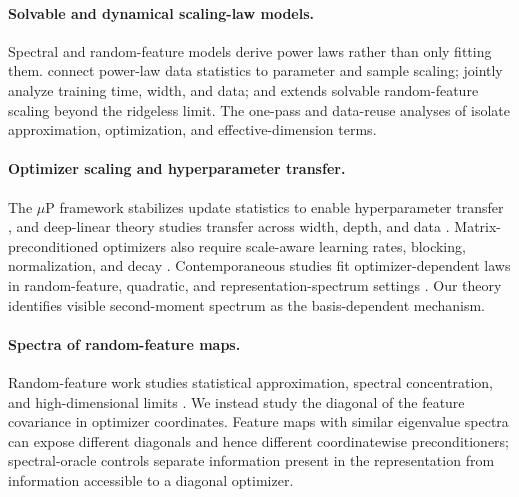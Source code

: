 \paragraph{Solvable and dynamical scaling-law models.}
Spectral and random-feature models derive power laws rather than only fitting them.  \citet{maloney2022solvable} connect power-law data statistics to parameter and sample scaling; \citet{bordelon2024dynamical} jointly analyze training time, width, and data; and \citet{zhang2024field} extends solvable random-feature scaling beyond the ridgeless limit.  The one-pass and data-reuse analyses of \citet{lin2024scaling,lin2025datareuse} isolate approximation, optimization, and effective-dimension terms.

\paragraph{Optimizer scaling and hyperparameter transfer.}
The $\mu$P framework stabilizes update statistics to enable hyperparameter transfer \cite{yang2021tensor}, and deep-linear theory studies transfer across width, depth, and data \cite{bordelon2025deep}.  Matrix-preconditioned optimizers also require scale-aware learning rates, blocking, normalization, and decay \cite{qiu2025hyperparameter}.  Contemporaneous studies fit optimizer-dependent laws in random-feature, quadratic, and representation-spectrum settings \cite{ramani2026optimizer,volkova2026robust,jha2026spectral}.  Our theory identifies visible second-moment spectrum as the basis-dependent mechanism.

\paragraph{Spectra of random-feature maps.}
Random-feature work studies statistical approximation, spectral concentration, and high-dimensional limits \cite{avron2017random,liao2018spectrum,ma2020slow,chen2022concentration,bosch2023precise}.  We instead study the diagonal of the feature covariance in optimizer coordinates.  Feature maps with similar eigenvalue spectra can expose different diagonals and hence different coordinatewise preconditioners; spectral-oracle controls separate information present in the representation from information accessible to a diagonal optimizer.
